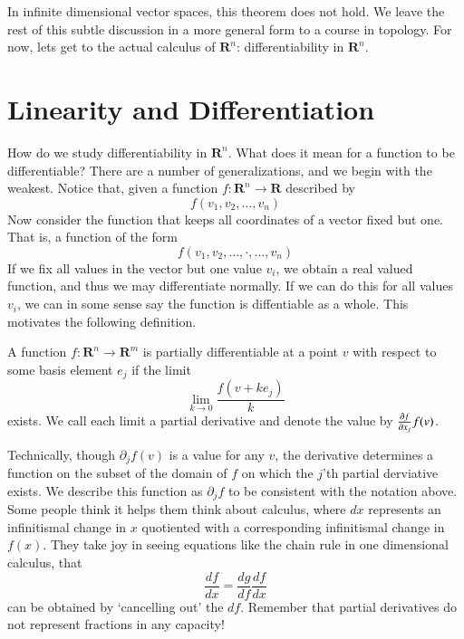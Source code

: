 In infinite dimensional vector spaces, this theorem does not hold. We leave the rest of this subtle discussion in a more general form to a course in topology. For now, lets get to the actual calculus of $\mathbf{R}^n$: differentiability in $\mathbf{R}^n$.







\chapter{Linearity and Differentiation}

How do we study differentiability in $\mathbf{R}^n$. What does it mean for a function to be differentiable? There are a number of generalizations, and we begin with the weakest. Notice that, given a function $f:\mathbf{R}^n \to \mathbf{R}$ described by
%
\[ f(v_1, v_2, \dots ,v_n) \]
%
Now consider the function that keeps all coordinates of a vector fixed but one. That is, a function of the form
%
\[ f(v_1, v_2, \dots, \cdot, \dots, v_n) \]
%
If we fix all values in the vector but one value $v_i$, we obtain a real valued function, and thus we may differentiate normally. If we can do this for all values $v_i$, we can in some sense say the function is diffentiable as a whole. This motivates the following definition.

\begin{definition}
  A function $f: \mathbf{R}^n \to \mathbf{R}^m$ is partially differentiable at a point $v$ with respect to some basis element $e_j$ if the limit
  \[ \lim_{k \to 0} \frac{f(v + ke_j)}{k} \]
  exists. We call each limit a partial derivative and denote the value by $\frac{\partial f}{\partial x_j}f(v)$.
\end{definition}

Technically, though $\partial_jf(v)$ is a value for any $v$, the derivative determines a function on the subset of the domain of $f$ on which the $j$'th partial derviative exists. We describe this function as $\partial_jf$ to be consistent with the notation above. Some people think it helps them think about calculus, where $dx$ represents an infinitismal change in $x$ quotiented with a corresponding infinitismal change in $f(x)$. They take joy in seeing equations like the chain rule in one dimensional calculus, that
%
\[ \frac{df}{dx} = \frac{dg}{df} \frac{df}{dx} \]
%
can be obtained by `cancelling out' the $df$. Remember that partial derivatives do not represent fractions in any capacity!

